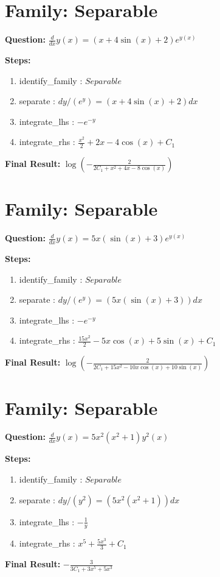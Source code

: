 \documentclass{article}
\begin{document}
\section*{Family: Separable}
\textbf{Question:} $\frac{d}{d x} y{\left(x \right)} = \left(x + 4 \sin{\left(x \right)} + 2\right) e^{y{\left(x \right)}}$

\textbf{Steps:}
\begin{enumerate}
\item identify_family :  $Separable$
\item separate :  $dy / (e^{y}) = (x + 4 \sin{\left(x \right)} + 2) dx$
\item integrate_lhs :  $- e^{- y}$
\item integrate_rhs :  $\frac{x^{2}}{2} + 2 x - 4 \cos{\left(x \right)} + C_1$
\end{enumerate}
\textbf{Final Result:} $\log{\left(- \frac{2}{2 C_{1} + x^{2} + 4 x - 8 \cos{\left(x \right)}} \right)}$

\section*{Family: Separable}
\textbf{Question:} $\frac{d}{d x} y{\left(x \right)} = 5 x \left(\sin{\left(x \right)} + 3\right) e^{y{\left(x \right)}}$

\textbf{Steps:}
\begin{enumerate}
\item identify_family :  $Separable$
\item separate :  $dy / (e^{y}) = (5 x \left(\sin{\left(x \right)} + 3\right)) dx$
\item integrate_lhs :  $- e^{- y}$
\item integrate_rhs :  $\frac{15 x^{2}}{2} - 5 x \cos{\left(x \right)} + 5 \sin{\left(x \right)} + C_1$
\end{enumerate}
\textbf{Final Result:} $\log{\left(- \frac{2}{2 C_{1} + 15 x^{2} - 10 x \cos{\left(x \right)} + 10 \sin{\left(x \right)}} \right)}$

\section*{Family: Separable}
\textbf{Question:} $\frac{d}{d x} y{\left(x \right)} = 5 x^{2} \left(x^{2} + 1\right) y^{2}{\left(x \right)}$

\textbf{Steps:}
\begin{enumerate}
\item identify_family :  $Separable$
\item separate :  $dy / (y^{2}) = (5 x^{2} \left(x^{2} + 1\right)) dx$
\item integrate_lhs :  $- \frac{1}{y}$
\item integrate_rhs :  $x^{5} + \frac{5 x^{3}}{3} + C_1$
\end{enumerate}
\textbf{Final Result:} $- \frac{3}{3 C_{1} + 3 x^{5} + 5 x^{3}}$
\end{document}

